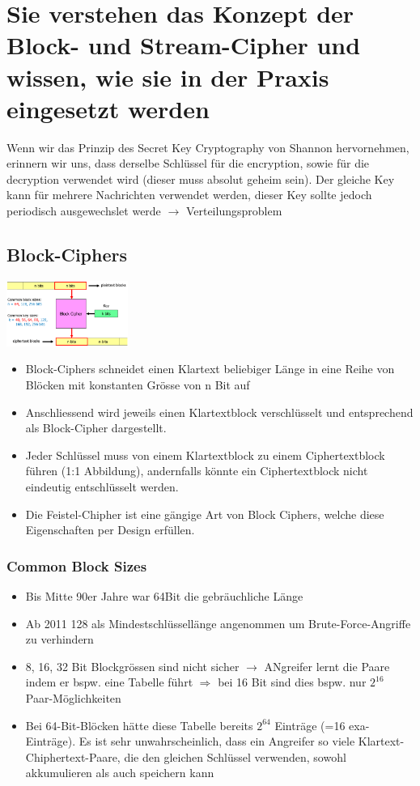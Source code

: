 \documentclass{report}
\newenvironment{Figure}
	{\par\medskip\noindent\minipage{\linewidth}}
	{\endminipage\par\medskip}
\theoremstyle{definition}
\theoremstyle{example}
\begin{document}
\section{Sie verstehen das Konzept der Block- und Stream-Cipher und wissen, wie sie in der Praxis eingesetzt werden}
Wenn wir das Prinzip des Secret Key Cryptography von Shannon hervornehmen, erinnern wir uns, dass derselbe Schlüssel für die encryption, sowie für die decryption verwendet wird (dieser muss absolut geheim sein). Der gleiche Key kann für mehrere Nachrichten verwendet werden, dieser Key sollte jedoch periodisch ausgewechslet werde $\rightarrow$ Verteilungsproblem
	
	\subsection{Block-Ciphers}
\begin{Figure}
\centering
\includegraphics[width=150px]{img/BlockCiphers.png}
	\label{fig:Block Ciphers}
\end{Figure}

\begin{itemize}
	\item Block-Ciphers schneidet einen Klartext beliebiger Länge in eine Reihe von Blöcken mit konstanten Grösse von n Bit auf
	\item Anschliessend wird jeweils einen Klartextblock verschlüsselt und entsprechend als Block-Cipher dargestellt.
	\item Jeder Schlüssel muss von einem Klartextblock zu einem Ciphertextblock führen (1:1 Abbildung), andernfalls könnte ein Ciphertextblock nicht eindeutig entschlüsselt werden.
	\item Die Feistel-Chipher ist eine gängige Art von Block Ciphers, welche diese Eigenschaften per Design erfüllen.
\end{itemize}

		\subsubsection{Common Block Sizes}
\begin{itemize}
	\item Bis Mitte 90er Jahre war 64Bit die gebräuchliche Länge
	\item Ab 2011 128 als Mindestschlüssellänge angenommen um Brute-Force-Angriffe zu verhindern
	\item 8, 16, 32 Bit Blockgrössen sind nicht sicher $\rightarrow$ ANgreifer lernt die Paare indem er bspw. eine Tabelle führt $\Rightarrow$ bei 16 Bit sind dies bspw. nur $2^{16}$ Paar-Möglichkeiten
	\item Bei 64-Bit-Blöcken hätte diese Tabelle bereits $2^{64}$ Einträge (=16 exa-Einträge). Es ist sehr unwahrscheinlich, dass ein Angreifer so viele Klartext-Chiphertext-Paare, die den gleichen Schlüssel verwenden, sowohl akkumulieren als auch speichern kann
\end{itemize}
\end{document}

